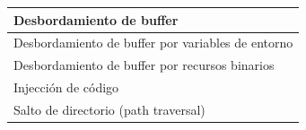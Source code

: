  \FloatBarrier
   \begin{table}[h]
    \begin{center}
   \begin{tabular}{|l|} \hline 
   Desbordamiento de buffer \\ \hline 
   Desbordamiento de buffer por variables de entorno \\ \hline
   Desbordamiento de buffer por recursos binarios \\ \hline 
   Injección de código \\ \hline 
   Salto de directorio (path traversal) \\ \hline 
   \end{tabular}
   \end{center}
   \end{table}
   \FloatBarrier


